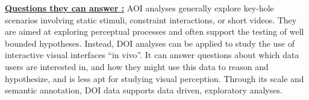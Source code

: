 \textbf{\underline{Questions they can answer :}} AOI analyses generally explore key-hole scenarios involving static stimuli, constraint interactions, or short videos. They are aimed at exploring perceptual processes and often support the testing of well bounded hypotheses. Instead, DOI analyses can be applied to study the use of interactive visual interfaces ``in vivo''. It can answer questions about which data users are interested in, and how they might use this data to reason and hypothesize, and is less apt for studying visual perception. Through its scale and semantic annotation, DOI data supports data driven, exploratory analyses. 
 










